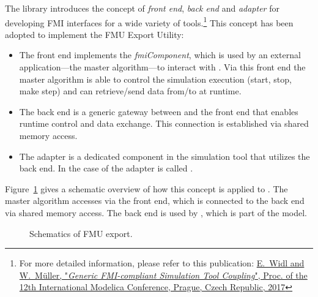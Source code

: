 The \fmipp library introduces the concept of \emph{front end}, \emph{back end} and \emph{adapter} for developing FMI interfaces for a wide variety of tools.\footnote{For more detailed information, please refer to this publication: \href{https://modelica.org/events/modelica2017/proceedings/html/submissions/ecp17132321_WidlMuller.pdf}{E.~Widl and W.~M\"uller, "\textit{Generic FMI-compliant Simulation Tool Coupling}", Proc. of the 12th International Modelica Conference, Prague, Czech Republic, 2017}} This concept has been adopted to implement the \fmipp \trnsys FMU Export Utility:
\begin{itemize}
  \item The front end implements the \emph{fmiComponent}, which is used by an external application---the master algorithm---to interact with \trnsys. Via this front end the master algorithm is able to control the simulation execution (start, stop, make step) and can retrieve/send data from/to \trnsys at runtime.
  \item The back end is a generic gateway between \trnsys and the front end that enables runtime control and data exchange. This connection is established via shared memory access.
  \item The adapter is a dedicated component in the simulation tool that utilizes the back end. In the case of \trnsys the adapter is called \type.
\end{itemize}
Figure~\ref{fig:schematics} gives a schematic overview of how this concept is applied to \trnsys. The master algorithm accesses \trnsys via the front end, which is connected to the back end via shared memory access. The back end is used by \type, which is part of the \trnsys model.

\begin{figure}[h!]
\caption{Schematics of \fmipp \trnsys FMU export.}
\label{fig:schematics}
\end{figure}
